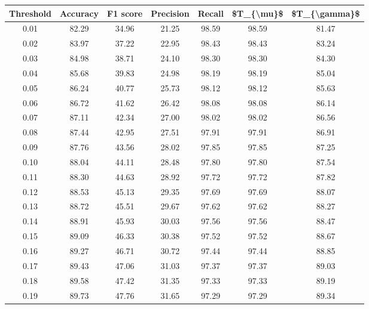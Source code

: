 \begin{tabular}{|c|c|c|c|c|c|c|}
\hline
 Threshold &  Accuracy &  F1 score &  Precision &  Recall &  \$T\_\{\textbackslash mu\}\$ &  \$T\_\{\textbackslash gamma\}\$ \\
\hline
      0.01 &     82.29 &     34.96 &      21.25 &   98.59 &      98.59 &         81.47 \\
      0.02 &     83.97 &     37.22 &      22.95 &   98.43 &      98.43 &         83.24 \\
      0.03 &     84.98 &     38.71 &      24.10 &   98.30 &      98.30 &         84.30 \\
      0.04 &     85.68 &     39.83 &      24.98 &   98.19 &      98.19 &         85.04 \\
      0.05 &     86.24 &     40.77 &      25.73 &   98.12 &      98.12 &         85.63 \\
      0.06 &     86.72 &     41.62 &      26.42 &   98.08 &      98.08 &         86.14 \\
      0.07 &     87.11 &     42.34 &      27.00 &   98.02 &      98.02 &         86.56 \\
      0.08 &     87.44 &     42.95 &      27.51 &   97.91 &      97.91 &         86.91 \\
      0.09 &     87.76 &     43.56 &      28.02 &   97.85 &      97.85 &         87.25 \\
      0.10 &     88.04 &     44.11 &      28.48 &   97.80 &      97.80 &         87.54 \\
      0.11 &     88.30 &     44.63 &      28.92 &   97.72 &      97.72 &         87.82 \\
      0.12 &     88.53 &     45.13 &      29.35 &   97.69 &      97.69 &         88.07 \\
      0.13 &     88.72 &     45.51 &      29.67 &   97.62 &      97.62 &         88.27 \\
      0.14 &     88.91 &     45.93 &      30.03 &   97.56 &      97.56 &         88.47 \\
      0.15 &     89.09 &     46.33 &      30.38 &   97.52 &      97.52 &         88.67 \\
      0.16 &     89.27 &     46.71 &      30.72 &   97.44 &      97.44 &         88.85 \\
      0.17 &     89.43 &     47.06 &      31.03 &   97.37 &      97.37 &         89.03 \\
      0.18 &     89.58 &     47.42 &      31.35 &   97.33 &      97.33 &         89.19 \\
      0.19 &     89.73 &     47.76 &      31.65 &   97.29 &      97.29 &         89.34 \\

\end{tabular}
